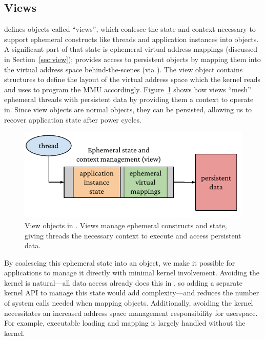 \subsection{Views}
\label{sec:view_impl}

\Twizzler defines objects called ``views'', which coalesce the state
and context necessary to support ephemeral constructs like threads and application instances into
\Twizzler objects. A significant part of that state is ephemeral virtual address mappings (discussed in Section~\ref{sec:view}); \Twizzler
provides access to persistent objects by mapping them into the virtual address space
behind-the-scenes (via \libcore). The view object contains structures to define the layout of the
virtual address space which the kernel reads and uses to program the MMU accordingly. Figure~\ref{fig:view2} shows how
views ``mesh'' ephemeral threads with persistent data by providing them a context to operate in.
Since view objects are normal \Twizzler objects, they can be persisted, allowing
us to recover application state after power cycles.

\begin{figure}
    \centering
    \includegraphics[width=\linewidth]{fig/view2}
    \caption[View objects in Twizzler]{View objects in \Twizzler. Views manage ephemeral constructs and state, giving threads
        the necessary context to execute and access persistent data.}
    \label{fig:view2}
\end{figure}


By coalescing this ephemeral state
into an object, we make it possible for applications to manage it directly with minimal kernel
involvement. Avoiding the kernel is natural---all data access already does this in \Twizzler, so
adding a separate kernel API to manage this state would add complexity---and reduces the number of
system calls needed when mapping objects. Additionally, avoiding the kernel necessitates an
increased address space management responsibility for userspace. For example, executable loading
and mapping is largely handled without the kernel.

